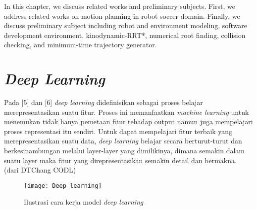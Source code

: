 \documentclass[../thesis.tex]{subfiles}
\begin{document}
   

In this chapter, we discuss related works and preliminary subjects. First, we address related works on motion planning in robot soccer domain. Finally, we discuss preliminary subject including robot and environment modeling, software development environment, kinodynamic-RRT*, numerical root finding, collision checking, and minimum-time trajectory generator.

\section{\textit{Deep Learning}}
Pada [5] dan [6] \textit{deep learning} didefinisikan sebagai proses belajar merepresentasikan suatu fitur. Proses ini memanfaatkan \textit{machine learning} untuk menemukan tidak hanya pemetaan fitur tehadap output namun juga mempelajari proses representasi itu sendiri.
Untuk dapat mempelajari fitur terbaik yang merepresentasikan suatu data, \textit{deep learning} belajar secara berturut-turut dan berkesinambungan melalui layer-layer yang dimilikinya, dimana semakin dalam suatu layer maka fitur yang direpresentasikan semakin detail dan bermakna.
(dari DTChang CODL)

\begin{figure}
	\centering
	\texttt{[image: Deep\_learning]}
	\caption{Ilustrasi cara kerja model \textit{deep learning}}
	\label{Dl_model}
\end{figure}
\end{document}
